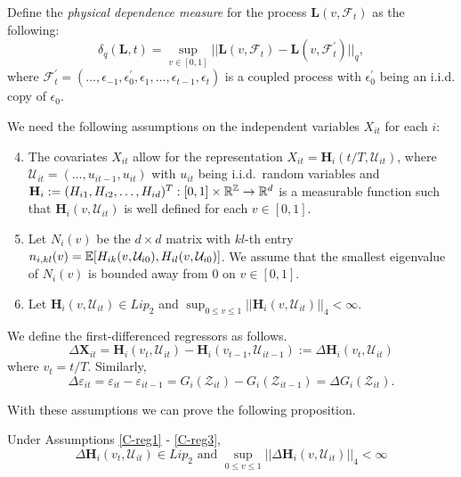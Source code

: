 \documentclass[a4paper,12pt]{article}
\begin{document}
Define the \textit{physical dependence measure} for the process $\mathbf{L}(v, \mathcal{F}_t)$ as the following:
\[ \delta_q(\mathbf{L}, t) = \sup_{v\in[0,1]} || \mathbf{L}(v, \mathcal{F}_t) - \mathbf{L}(v, \mathcal{F}_t^\prime) ||_q,
\]
where $\mathcal{F}_t^\prime  = (\ldots, \epsilon_{-1}, \epsilon^\prime_0, \epsilon_1, \ldots, \epsilon_{t-1}, \epsilon_t)$ is a coupled process with $\epsilon_0^\prime$ being an i.i.d. copy of $\epsilon_0$.


We need the following assumptions on the independent variables $X_{it}$ for each $i$:

\begin{enumerate}[label=(C\arabic*),leftmargin=1.05cm]
\setcounter{enumi}{3}

\item \label{C-reg1} The covariates $X_{it}$ allow for the representation $X_{it} = \mathbf{H}_i(t/T, \mathcal{U}_{it})$, where $\mathcal{U}_{it} =(\ldots,u_{it-1},u_{it})$ with $u_{it}$ being i.i.d.\ random variables and $\mathbf{H}_i := (H_{i1}, H_{i2}, \ldots, H_{id})^T: [0, 1] \times \mathbb{R}^{\mathbb{Z}} \rightarrow \mathbb{R}^d$ is a measurable function such that $\mathbf{H}_i(v, \mathcal{U}_{it})$ is well defined for each $v\in [0,1]$. 

\item \label{C-reg2} Let $N_i(v)$ be the $d\times d$ matrix with $kl$-th entry $n_{i, kl}(v) = \mathbb{E}[H_{ik}(v, \mathcal{U}_{i0}), H_{il}(v, \mathcal{U}_{i0})]$. We assume that the smallest eigenvalue of $N_i(v)$ is bounded away from $0$ on $v\in[0,1]$.

\item \label{C-reg3} Let $\mathbf{H}_{i}(v, \mathcal{U}_{it}) \in Lip_2$ and $\sup_{0\leq v\leq 1}||\mathbf{H}_{i}(v, \mathcal{U}_{it})||_4 <\infty$.
\end{enumerate}

We define the first-differenced regressors as follows.
\[ \Delta \mathbf{X}_{it} =\mathbf{H}_i(v_t, \mathcal{U}_{it}) - \mathbf{H}_i(v_{t-1}, \mathcal{U}_{it-1}) := \Delta \mathbf{H}_i(v_t, \mathcal{U}_{it}) \]
where $v_t = t/T$. Similarly, 
\[\Delta \varepsilon_{it} = \varepsilon_{it} - \varepsilon_{it-1} = G_i(\mathcal{Z}_{it}) - G_i(\mathcal{Z}_{it-1}) = \Delta G_i(\mathcal{Z}_{it}).
\]
 
With these assumptions we can prove the following proposition.
\begin{prop}\label{prop-reg-1}
Under Assumptions \ref{C-reg1} - \ref{C-reg3},
\[ \Delta \mathbf{H}_i(v_t, \mathcal{U}_{it}) \in Lip_2 \text{ and } \sup_{0\leq v \leq 1} || \Delta \mathbf{H}_i(v, \mathcal{U}_{it})||_4 < \infty
\]
\end{prop}
\end{document}
